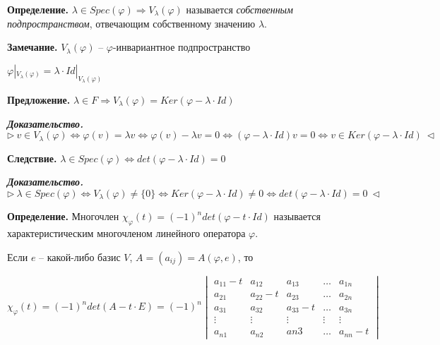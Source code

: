 \vspace{\baselineskip}
\textbf{Определение.} $\lambda \in Spec(\varphi) \Rightarrow V_{\lambda} (\varphi)$ называется \textit{собственным подпространством}, отвечающим собственному значению $\lambda$.

\vspace{\baselineskip}
\textbf{Замечание.} $V_{\lambda} (\varphi)$ -- $\varphi$-инвариантное подпространство

$\varphi |_{V_{\lambda} (\varphi)} = \lambda \cdot Id |_{V_{\lambda} (\varphi)}$

\vspace{\baselineskip}
\textbf{Предложение.} $\lambda \in F \Rightarrow V_{\lambda} (\varphi) = Ker(\varphi - \lambda \cdot Id)$

\vspace{\baselineskip}
\textbf{\textit{Доказательство.}} $\rhd \ v \in V_{\lambda} (\varphi) \Leftrightarrow \varphi (v) = \lambda v \Leftrightarrow \varphi(v) - \lambda v = 0 \Leftrightarrow (\varphi - \lambda \cdot Id) v = 0 \Leftrightarrow v \in Ker(\varphi - \lambda \cdot Id) \ \lhd$

\vspace{\baselineskip}
\textbf{Следствие.} $\lambda \in Spec(\varphi) \Leftrightarrow det(\varphi - \lambda \cdot Id) = 0$

\vspace{\baselineskip}
\textbf{\textit{Доказательство.}} $\rhd \ \lambda \in Spec(\varphi) \Leftrightarrow V_{\lambda} (\varphi) \neq \{0\} \Leftrightarrow Ker(\varphi - \lambda \cdot Id) \neq 0 \Leftrightarrow det (\varphi - \lambda \cdot Id) = 0 \ \lhd$

\vspace{\baselineskip}
\textbf{Определение.} Многочлен $\chi_{\varphi} (t) = (-1)^n det (\varphi - t \cdot Id)$ называется $\textit{характеристическим многочленом}$ линейного оператора $\varphi$.

\vspace{\baselineskip}
Если $e$ -- какой-либо базис $V$, $A = (a_{ij}) = A(\varphi, e)$, то

$\chi_{\varphi} (t) = (-1)^n det (A - t \cdot E) = (-1)^n \begin{vmatrix} a_{11} - t & a_{12} & a_{13} & \dots & a_{1n} \\
a_{21} & a_{22} - t & a_{23} & \dots & a_{2n} \\ 
a_{31} & a_{32} & a_{33} - t & \dots & a_{3n} \\
\vdots & \vdots & \vdots & \vdots & \vdots \\
a_{n1} & a_{n2} & a{n3} & \dots & a_{nn} - t \end{vmatrix}$

